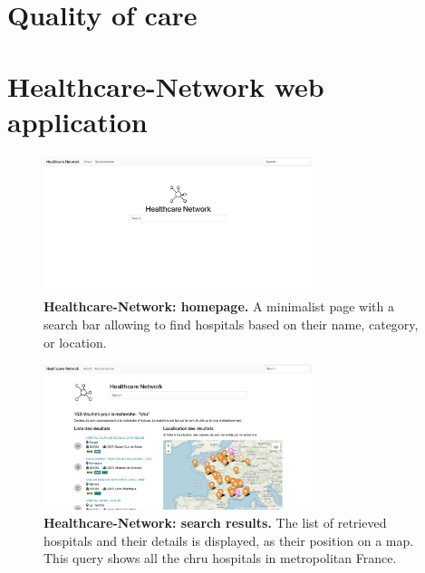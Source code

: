 \section{Quality of care}

\section{Healthcare-Network web application}

\begin{figure}[H]
    \includegraphics[width=0.7\textwidth]{images/healthcare-network/home.png}
    \centering
    \caption{
        \textbf{Healthcare-Network: homepage.} A minimalist page with a search bar allowing to find hospitals based on their name, category, or location.
    }
    \label{fig:hn-home}
\end{figure}


\begin{figure}[H]
    \includegraphics[width=0.7\textwidth]{images/healthcare-network/search.png}
    \centering
    \caption{
        \textbf{Healthcare-Network: search results.} The list of retrieved hospitals and their details is displayed, as their position on a map. This query shows all the \ac{chru} hospitals in metropolitan France.
    }
    \label{fig:hn-search}
\end{figure}


